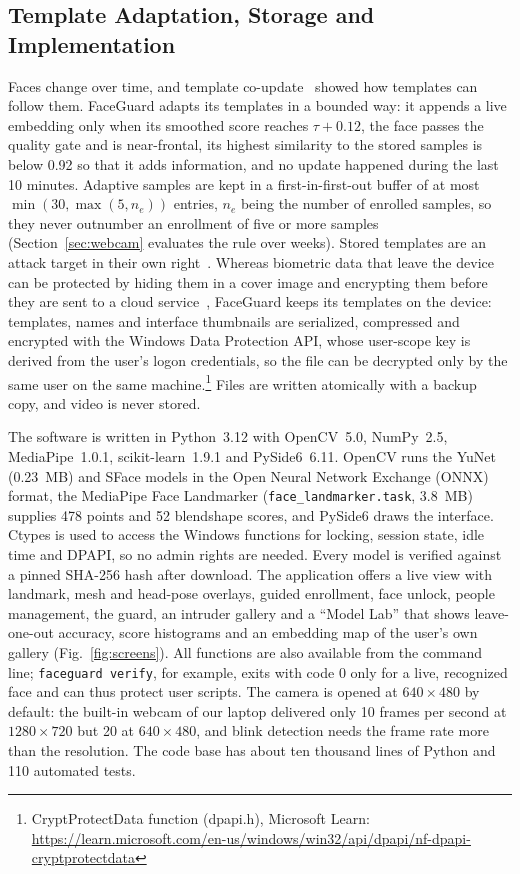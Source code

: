 \documentclass{ieeeaccess}
\begin{document}
\subsection{Template Adaptation, Storage and Implementation}\label{sec:adaptive}
Faces change over time, and template co-update~\cite{rattani2008coupdate} showed how templates can follow them. FaceGuard adapts its templates in a bounded way: it appends a live embedding only when its smoothed score reaches $\tau+0.12$, the face passes the quality gate and is near-frontal, its highest similarity to the stored samples is below 0.92 so that it adds information, and no update happened during the last 10 minutes. Adaptive samples are kept in a first-in-first-out buffer of at most $\min(30,\max(5,n_e))$ entries, $n_e$ being the number of enrolled samples, so they never outnumber an enrollment of five or more samples (Section~\ref{sec:webcam} evaluates the rule over weeks). Stored templates are an attack target in their own right~\cite{ratha2001enhancing}. Whereas biometric data that leave the device can be protected by hiding them in a cover image and encrypting them before they are sent to a cloud service~\cite{prabhu2022stego}, FaceGuard keeps its templates on the device: templates, names and interface thumbnails are serialized, compressed and encrypted with the Windows Data Protection API, whose user-scope key is derived from the user's logon credentials, so the file can be decrypted only by the same user on the same machine.\footnote{CryptProtectData function (dpapi.h), Microsoft Learn: \url{https://learn.microsoft.com/en-us/windows/win32/api/dpapi/nf-dpapi-cryptprotectdata}} Files are written atomically with a backup copy, and video is never stored.

The software is written in Python~3.12 with OpenCV~5.0, NumPy~2.5, MediaPipe~1.0.1, scikit-learn~1.9.1 and PySide6~6.11. OpenCV runs the YuNet (0.23~MB) and SFace models in the Open Neural Network Exchange (ONNX) format, the MediaPipe Face Landmarker (\texttt{face\_\allowbreak{}landmarker.task}, 3.8~MB) supplies 478 points and 52 blendshape scores, and PySide6 draws the interface. Ctypes is used to access the Windows functions for locking, session state, idle time and DPAPI, so no admin rights are needed. Every model is verified against a pinned SHA-256 hash after download. The application offers a live view with landmark, mesh and head-pose overlays, guided enrollment, face unlock, people management, the guard, an intruder gallery and a ``Model Lab'' that shows leave-one-out accuracy, score histograms and an embedding map of the user's own gallery (Fig.~\ref{fig:screens}). All functions are also available from the command line; \texttt{faceguard verify}, for example, exits with code 0 only for a live, recognized face and can thus protect user scripts. The camera is opened at $640\times480$ by default: the built-in webcam of our laptop delivered only 10 frames per second at $1280\times720$ but 20 at $640\times480$, and blink detection needs the frame rate more than the resolution. The code base has about ten thousand lines of Python and 110 automated tests.
\end{document}
